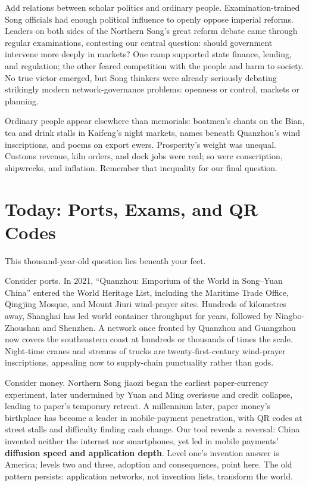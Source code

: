 Add relations between scholar politics and ordinary people. Examination-trained Song officials had enough political influence to openly oppose imperial reforms. Leaders on both sides of the Northern Song's great reform debate came through regular examinations, contesting our central question: should government intervene more deeply in markets? One camp supported state finance, lending, and regulation; the other feared competition with the people and harm to society. No true victor emerged, but Song thinkers were already seriously debating strikingly modern network-governance problems: openness or control, markets or planning.

Ordinary people appear elsewhere than memorials: boatmen's chants on the Bian, tea and drink stalls in Kaifeng's night markets, names beneath Quanzhou's wind inscriptions, and poems on export ewers. Prosperity's weight was unequal. Customs revenue, kiln orders, and dock jobs were real; so were conscription, shipwrecks, and inflation. Remember that inequality for our final question.

\section{Today: Ports, Exams, and QR Codes}
This thousand-year-old question lies beneath your feet.

Consider ports. In 2021, ``Quanzhou: Emporium of the World in Song--Yuan China'' entered the World Heritage List, including the Maritime Trade Office, Qingjing Mosque, and Mount Jiuri wind-prayer sites. Hundreds of kilometres away, Shanghai has led world container throughput for years, followed by Ningbo-Zhoushan and Shenzhen. A network once fronted by Quanzhou and Guangzhou now covers the southeastern coast at hundreds or thousands of times the scale. Night-time cranes and streams of trucks are twenty-first-century wind-prayer inscriptions, appealing now to supply-chain punctuality rather than gods.

Consider money. Northern Song jiaozi began the earliest paper-currency experiment, later undermined by Yuan and Ming overissue and credit collapse, leading to paper's temporary retreat. A millennium later, paper money's birthplace has become a leader in mobile-payment penetration, with QR codes at street stalls and difficulty finding cash change. Our tool reveals a reversal: China invented neither the internet nor smartphones, yet led in mobile payments' \textbf{diffusion speed and application depth}. Level one's invention answer is America; levels two and three, adoption and consequences, point here. The old pattern persists: application networks, not invention lists, transform the world.

